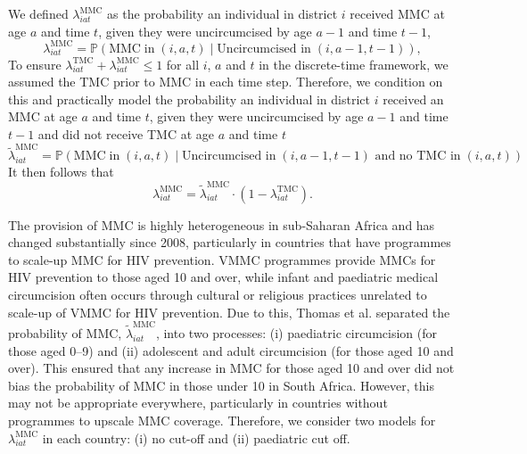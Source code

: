 \documentclass{article}
\begin{document}
\begin{appendix}
\noindent We defined $\lambda^{\text{MMC}}_{iat}$ as the probability an individual in district $i$ received MMC at age $a$ and time $t$, given they were uncircumcised by age $a-1$ and time $t-1$,  
\begin{equation*}
		\lambda^{\text{MMC}}_{iat} = \mathbb{P}(\text{MMC} \; \text{in} \; (i,a,t) \; | \; \text{Uncircumcised in} \; (i,a-1, t-1)),
\end{equation*}
To ensure $\lambda^{\text{TMC}}_{iat} + \lambda^{\text{MMC}}_{iat} \leq 1$ for all $i$, $a$ and $t$ in the discrete-time framework, we assumed the TMC prior to MMC in each time step. Therefore, we condition on this and practically model the probability an individual in district $i$ received an MMC at age $a$ and time $t$, given they were uncircumcised by age $a-1$ and time $t-1$ and did not receive TMC at age $a$ and time $t$
\begin{equation*}
		\tilde{\lambda}^{\text{MMC}}_{iat} = \mathbb{P}(\text{MMC} \; \text{in} \; (i,a,t) \; | \; \text{Uncircumcised in} \; (i,a-1, t-1) \text{ and no TMC in} \; (i,a, t))
\end{equation*}
It then follows that 
\begin{equation*}
		\lambda^{\text{MMC}}_{iat} = \tilde{\lambda}^{\text{MMC}}_{iat}\cdot (1-\lambda^{\text{TMC}}_{iat}).
\end{equation*}

The provision of MMC is highly heterogeneous in sub-Saharan Africa and has changed substantially since 2008, particularly in countries that have programmes to scale-up MMC for HIV prevention. VMMC programmes provide MMCs for HIV prevention to those aged 10 and over, while infant and paediatric medical circumcision often occurs through cultural or religious practices unrelated to scale-up of VMMC for HIV prevention. Due to this, Thomas et al. \cite{thomas2021multilevel} separated the probability of MMC, $\tilde{\lambda}^{\text{MMC}}_{iat}$, into two processes: (i) paediatric circumcision (for those aged 0--9) and (ii) adolescent and adult circumcision (for those aged 10 and over). This ensured that any increase in MMC for those aged 10 and over did not bias the probability of MMC in those under 10 in South Africa. However, this may not be appropriate everywhere, particularly in countries without programmes to upscale MMC coverage. Therefore, we consider two models for $\lambda^{\text{MMC}}_{iat}$ in each country: (i) no cut-off and (ii) paediatric cut off.


\end{appendix}
\end{document}
